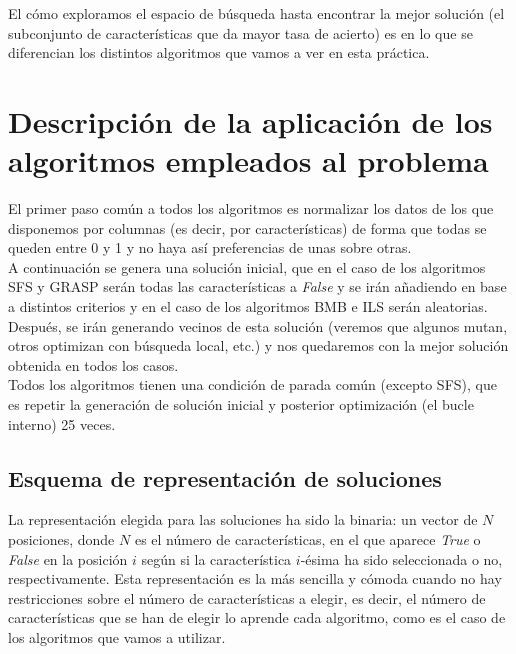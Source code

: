 \documentclass[12pt]{article}
\begin{document}
El cómo exploramos el espacio de búsqueda hasta encontrar la mejor solución (el subconjunto de características que da mayor tasa de acierto) es en lo que se diferencian los distintos algoritmos que vamos a ver en esta práctica.

\newpage

\section{Descripción de la aplicación de los algoritmos empleados al problema}
El primer paso común a todos los algoritmos es normalizar los datos de los que disponemos por columnas (es decir, por características) de forma que todas se queden entre 0 y 1 y no haya así preferencias de unas sobre otras.\\

A continuación se genera una solución inicial, que en el caso de los algoritmos SFS y GRASP serán todas las características a \textit{False} y se irán añadiendo en base a distintos criterios y en el caso de los algoritmos BMB e ILS serán aleatorias. Después, se irán generando vecinos de esta solución (veremos que algunos mutan, otros optimizan con búsqueda local, etc.) y nos quedaremos con la mejor solución obtenida en todos los casos.\\

Todos los algoritmos tienen una condición de parada común (excepto SFS), que es repetir la generación de solución inicial y posterior optimización (el bucle interno) 25 veces.

\subsection{Esquema de representación de soluciones}
La representación elegida para las soluciones ha sido la binaria: un vector de $N$ posiciones, donde $N$ es el número de características, en el que aparece \textit{True} o \textit{False} en la posición $i$ según si la característica $i$-ésima ha sido seleccionada o no, respectivamente. Esta representación es la más sencilla y cómoda cuando no hay restricciones sobre el número de características a elegir, es decir, el número de características que se han de elegir lo aprende cada algoritmo, como es el caso de los algoritmos que vamos a utilizar.
\end{document}
